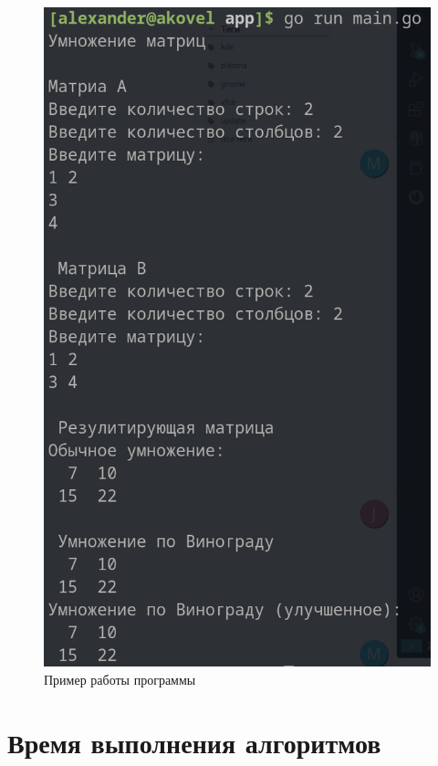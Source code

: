 \begin{figure}[ht!]
	\begin{center}
		\captionsetup{singlelinecheck = false, justification=centerfirst}
		\includegraphics[scale=0.5]{assets/demonstration.png}
		\caption{Пример работы программы}
		\label{demonstration}
	\end{center}
	
	
\end{figure}

\newpage

\section{Время выполнения алгоритмов}

